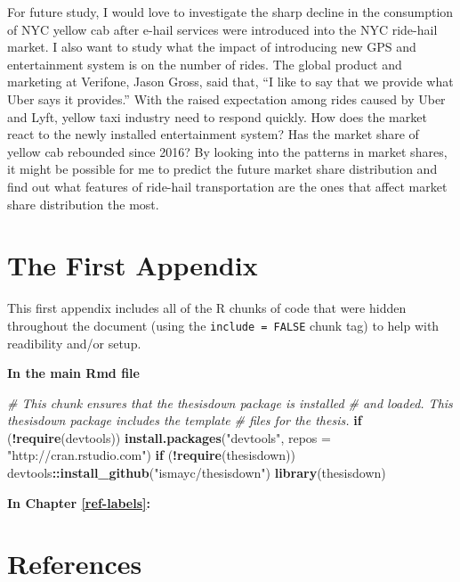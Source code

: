\documentclass[12pt,twoside]{reedthesis}
\newenvironment{Shaded}{\begin{snugshade}}{\end{snugshade}}
\newcommand{\KeywordTok}[1]{\textcolor[rgb]{0.13,0.29,0.53}{\textbf{#1}}}
\newcommand{\DataTypeTok}[1]{\textcolor[rgb]{0.13,0.29,0.53}{#1}}
\newcommand{\StringTok}[1]{\textcolor[rgb]{0.31,0.60,0.02}{#1}}
\newcommand{\CommentTok}[1]{\textcolor[rgb]{0.56,0.35,0.01}{\textit{#1}}}
\newcommand{\ControlFlowTok}[1]{\textcolor[rgb]{0.13,0.29,0.53}{\textbf{#1}}}
\newcommand{\OperatorTok}[1]{\textcolor[rgb]{0.81,0.36,0.00}{\textbf{#1}}}
\newcommand{\NormalTok}[1]{#1}
\theoremstyle{definition}
\theoremstyle{definition}
\theoremstyle{definition}
\theoremstyle{remark}
\begin{document}
For future study, I would love to investigate the sharp decline in the
consumption of NYC yellow cab after e-hail services were introduced into
the NYC ride-hail market. I also want to study what the impact of
introducing new GPS and entertainment system is on the number of rides.
The global product and marketing at Verifone, Jason Gross, said that,
``I like to say that we provide what Uber says it provides.'' With the
raised expectation among rides caused by Uber and Lyft, yellow taxi
industry need to respond quickly. How does the market react to the newly
installed entertainment system? Has the market share of yellow cab
rebounded since 2016? By looking into the patterns in market shares, it
might be possible for me to predict the future market share distribution
and find out what features of ride-hail transportation are the ones that
affect market share distribution the most.

\appendix

\chapter{The First Appendix}\label{the-first-appendix}

This first appendix includes all of the R chunks of code that were
hidden throughout the document (using the \texttt{include\ =\ FALSE}
chunk tag) to help with readibility and/or setup.

\textbf{In the main Rmd file}
\begin{Shaded}
\begin{Highlighting}[]
\CommentTok{# This chunk ensures that the thesisdown package is installed}
\CommentTok{# and loaded. This thesisdown package includes the template}
\CommentTok{# files for the thesis.}
\ControlFlowTok{if}\NormalTok{ (}\OperatorTok{!}\KeywordTok{require}\NormalTok{(devtools)) }\KeywordTok{install.packages}\NormalTok{(}\StringTok{"devtools"}\NormalTok{, }\DataTypeTok{repos =} \StringTok{"http://cran.rstudio.com"}\NormalTok{)}
\ControlFlowTok{if}\NormalTok{ (}\OperatorTok{!}\KeywordTok{require}\NormalTok{(thesisdown)) devtools}\OperatorTok{::}\KeywordTok{install_github}\NormalTok{(}\StringTok{"ismayc/thesisdown"}\NormalTok{)}
\KeywordTok{library}\NormalTok{(thesisdown)}
\end{Highlighting}
\end{Shaded}
\textbf{In Chapter \ref{ref-labels}:}

\backmatter

\chapter*{References}\label{references}
\end{document}
